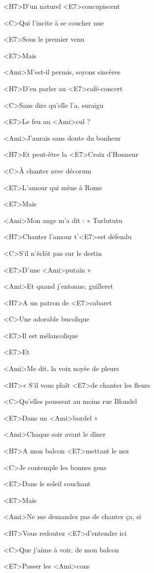 <H7>D'un naturel <E7>concupiscent

<C>Qui l'incite à se coucher nue

<E7>Sous le premier venu

<E7>Mais

<Ami>M'est-il permis, soyons sincères

<H7>D'en parler au <E7>café-concert

<C>Sans dire qu'elle l'a, suraigu

<E7>Le feu au <Ami>cul ?
\ks

\zr\kr

\zs
<Ami>J'aurais sans doute du bonheur

<H7>Et peut-être la <E7>Croix d'Honneur

<C>À chanter avec décorum

<E7>L'amour qui mène à Rome

<E7>Mais

<Ami>Mon ange m'a dit : « Turlututu

<H7>Chanter l'amour t'<E7>est défendu

<C>S'il n'éclôt pas sur le destin

<E7>D'une <Ami>putain »
\ks

\zr\kr

\zs
<Ami>Et quand j'entonne, guilleret

<H7>A un patron de <E7>cabaret

<C>Une adorable bucolique

<E7>Il est mélancolique

<E7>Et

<Ami>Me dit, la voix noyée de pleurs

<H7>« S'il vous plaît <E7>de chanter les fleurs

<C>Qu'elles poussent au moins rue Blondel

<E7>Dans un <Ami>bordel »
\ks

\zr\kr

\zs
<Ami>Chaque soir avant le dîner

<H7>A mon balcon <E7>mettant le nez

<C>Je contemple les bonnes gens

<E7>Dans le soleil couchant

<E7>Mais

<Ami>Ne me demandez pas de chanter ça, si

<H7>Vous redoutez <E7>d'entendre ici

<C>Que j'aime à voir, de mon balcon

<E7>Passer les <Ami>cons
\ks


